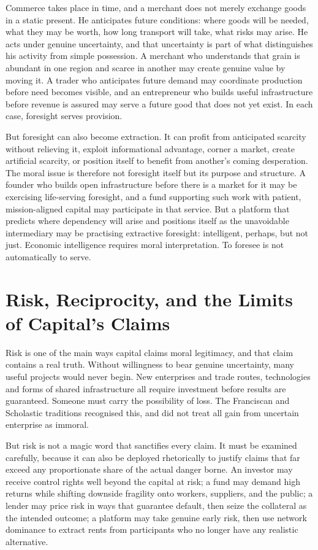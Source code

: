 \documentclass[11pt,a4paper,oneside]{book}
\begin{document}
Commerce takes place in time, and a merchant does not merely exchange goods in a static present. He anticipates future conditions: where goods will be needed, what they may be worth, how long transport will take, what risks may arise. He acts under genuine uncertainty, and that uncertainty is part of what distinguishes his activity from simple possession. A merchant who understands that grain is abundant in one region and scarce in another may create genuine value by moving it. A trader who anticipates future demand may coordinate production before need becomes visible, and an entrepreneur who builds useful infrastructure before revenue is assured may serve a future good that does not yet exist. In each case, foresight serves provision.

But foresight can also become extraction. It can profit from anticipated scarcity without relieving it, exploit informational advantage, corner a market, create artificial scarcity, or position itself to benefit from another's coming desperation. The moral issue is therefore not foresight itself but its purpose and structure. A founder who builds open infrastructure before there is a market for it may be exercising life-serving foresight, and a fund supporting such work with patient, mission-aligned capital may participate in that service. But a platform that predicts where dependency will arise and positions itself as the unavoidable intermediary may be practising extractive foresight: intelligent, perhaps, but not just. Economic intelligence requires moral interpretation. To foresee is not automatically to serve.

\section*{Risk, Reciprocity, and the Limits of Capital's Claims}

Risk is one of the main ways capital claims moral legitimacy, and that claim contains a real truth. Without willingness to bear genuine uncertainty, many useful projects would never begin. New enterprises and trade routes, technologies and forms of shared infrastructure all require investment before results are guaranteed. Someone must carry the possibility of loss. The Franciscan and Scholastic traditions recognised this, and did not treat all gain from uncertain enterprise as immoral.

But risk is not a magic word that sanctifies every claim. It must be examined carefully, because it can also be deployed rhetorically to justify claims that far exceed any proportionate share of the actual danger borne. An investor may receive control rights well beyond the capital at risk; a fund may demand high returns while shifting downside fragility onto workers, suppliers, and the public; a lender may price risk in ways that guarantee default, then seize the collateral as the intended outcome; a platform may take genuine early risk, then use network dominance to extract rents from participants who no longer have any realistic alternative.
\end{document}
